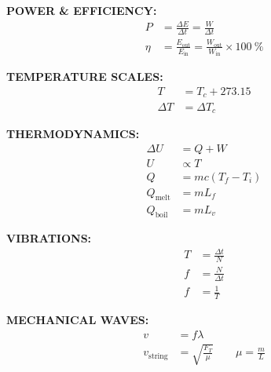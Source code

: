 \documentclass{../oss-handout}
\begin{document}
\begin{multicols*}{3}
  \textbf{POWER \& EFFICIENCY:}
  \begin{align*}
    P &=\frac{\Delta E}{\Delta t}=\frac W{\Delta t}\\
    \eta&=\frac{E_\text{out}}{E_\text{in}}=
  \frac{W_\text{out}}{W_\text{in}}\times
  \SI{100}{\percent}
  \end{align*}

  \textbf{TEMPERATURE SCALES:}
  \begin{align*}
    T&=T_c+273.15\\
    \Delta T&=\Delta T_c
  \end{align*}

  \textbf{THERMODYNAMICS:}
  \begin{align*}
    \Delta U &=Q+W \\
    U &\propto T\\
    Q &= mc(T_f-T_i)\\
    Q_\text{melt} &= mL_f\\ 
    Q_\text{boil} &= mL_v
  \end{align*}

  \textbf{VIBRATIONS:}
  \begin{align*}
    T &= \frac{\Delta t}N\\
    f &= \frac N{\Delta t}\\
    f &= \frac1T
  \end{align*}

  \textbf{MECHANICAL WAVES:}
  \begin{align*}
    v&=f\lambda\\
    v_\text{string}&=\sqrt{\frac{F_T}\mu}\quad\quad\mu=\frac mL\\
  \end{align*}


\end{multicols*}
\end{document}

